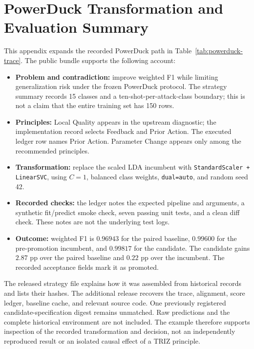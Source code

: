 \documentclass[manuscript,screen,nonacm]{acmart}
\begin{document}
\section{PowerDuck Transformation and Evaluation Summary}
\label{app:powerduck}

This appendix expands the recorded PowerDuck path in Table~\ref{tab:powerduck-trace}. The public bundle supports the following account:
\begin{itemize}
\item \textbf{Problem and contradiction:} improve weighted F1 while limiting
generalization risk under the frozen PowerDuck protocol.
The strategy summary records 15 classes and a ten-shot-per-attack-class
boundary; this is not a claim that the entire training set has 150 rows.
\item \textbf{Principles:} Local Quality appears in the upstream diagnostic;
the implementation record selects Feedback and Prior Action.
The executed ledger row names Prior Action. Parameter Change appears only
among the recommended principles.
\item \textbf{Transformation:} replace the scaled LDA incumbent with
\texttt{StandardScaler + LinearSVC}, using $C=1$,
balanced class weights, \texttt{dual=auto}, and random seed 42.
\item \textbf{Recorded checks:} the ledger notes the expected pipeline and
arguments, a synthetic fit/predict smoke check, seven passing unit tests,
and a clean diff check. These notes are not the underlying test logs.
\item \textbf{Outcome:} weighted F1 is $0.96943$ for the paired baseline,
$0.99600$ for the pre-promotion incumbent, and $0.99817$ for the candidate.
The candidate gains $2.87$ pp over the paired baseline and $0.22$ pp over
the incumbent. The recorded acceptance fields mark it as promoted.
\end{itemize}

The released strategy file explains how it was assembled from historical
records and lists their hashes. The additional release recovers the trace,
alignment, score ledger, baseline cache, and relevant source code.
One previously registered candidate-specification digest remains unmatched.
Raw predictions and the complete historical environment are not included. The example therefore supports inspection of the recorded
transformation and decision, not an independently reproduced result or
an isolated causal effect of a TRIZ principle.
\end{document}
